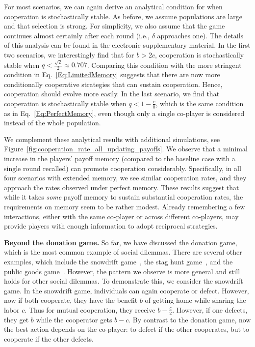 \documentclass[11pt]{article}
\def\esm{electronic supplementary material}
\newcommand{\FigHigherMemory}{Figure~\ref{fig:cooperation_rate_all_updating_payoffs}}
\theoremstyle{plainCl1}
\theoremstyle{plainCl2}
\begin{document}

For most scenarios, we can again derive an analytical condition for when cooperation is stochastically stable. 
As before, we assume populations are large and that selection is strong. 
For simplicity, we also assume that the game continues almost certainly after each round (i.e., $\delta$ approaches one). 
The details of this analysis can be found in the \esm. 
In the first two scenarios, we interestingly find that for $b\!>\!2c$, cooperation is stochastically stable when $q\!<\! \frac{\sqrt{2}}{2}\approx 0.707$. 
Comparing this condition with the more stringent condition in Eq.~\eqref{Eq:LimitedMemory} suggests that there are now more conditionally cooperative strategies that can sustain cooperation. 
Hence, cooperation should evolve more easily.
In the last scenario, we find that cooperation is stochastically stable when \(q
< 1 - \frac{c}{b}\), which is the same condition as in
Eq.~\eqref{Eq:PerfectMemory}, even though only a single co-player is considered
instead of the whole population. 


We complement these analytical results with additional simulations, see \FigHigherMemory.
We observe that a minimal increase in the players' payoff memory (compared to the baseline case with a single round recalled) can promote cooperation considerably. 
Specifically, in all four scenarios with extended memory, we see similar cooperation rates, and they approach the rates observed under perfect memory. 
These results suggest that while it takes {\it some} payoff memory to sustain substantial cooperation rates, the requirements on memory seem to be rather modest. 
Already remembering a few interactions, either with the same co-player or across different co-players, may provide players with enough information to adopt reciprocal strategies. 

{\bf Beyond the donation game.}
So far, we have discussed the donation game, which is the most common
example of social dilemmas. There are several other examples, which include the
snowdrift game~\cite{doebeli:Ecology:2005}, the stag hunt
game~\cite{pacheco:ProcB:2009}, and the public goods
game~\cite{pinheiro:PLoSCompBio:2014}. However, the pattern we observe is more
general and still holds for other social dilemmas. To demonstrate this, we
consider the snowdrift game. In the snowdrift game, individuals can again
cooperate or defect. However, now if both cooperate, they have the benefit \(b\)
of getting home while sharing the labor \(c\). Thus for mutual cooperation, they
receive \(b - \frac{c}{2}\). However, if one defects, they get \(b\) while
the cooperator gets \(b - c\). By contrast to the donation game, now
the best action depends on the co-player: to defect if the other cooperates, but
to cooperate if the other defects.
\end{document}
